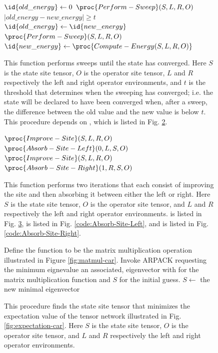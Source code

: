 \documentclass{article}
\begin{document}
\begin{figure}
\begin{codebox}
\li $\id{old\_energy} \gets 0$
\li $\proc{Perform-Sweep}(S,L,R,O)$
\li \While $|old\_energy-new\_energy| \ge t$
\li     \Do
\li         $\id{old\_energy} \gets \id{new\_energy}$
\li         $\proc{Perform-Sweep}(S,L,R,O)$
\li         $\id{new\_energy} \gets  \proc{Compute-Energy(S,L,R,O)}$
\end{codebox}
\caption{\label{code:Sweep-Until-Converged} This function performs sweeps until the state has converged. Here $S$ is the state site tensor, $O$ is the operator site tensor, $L$ and $R$ respectively the left and right operator environments, and $t$ is the threshold that determines when the sweeping has converged; i.e. the state will be declared to have been converged when, after a sweep, the difference between the old value and the new value is below $t$.  This procedure depends on , which is listed in Fig. \ref{code:Perform-Sweep}.}
\end{figure}

\begin{figure}
\begin{codebox}
\li $\proc{Improve-Site}(S,L,R,O)$
\li $\proc{Absorb-Site-Left}(0,L,S,O)$
\li $\proc{Improve-Site}(S,L,R,O)$
\li $\proc{Absorb-Site-Right}(1,R,S,O)$
\end{codebox}
\caption{\label{code:Perform-Sweep} This function performs two iterations that each consist of improving the site and then absorbing it between either the left or right.  Here $S$ is the state site tensor, $O$ is the operator site tensor, and $L$ and $R$ respectively the left and right operator environments.   is listed in Fig. \ref{code:Improve-Site},  is listed in Fig. \ref{code:Absorb-Site-Left}, and  is listed in Fig. \ref{code:Absorb-Site-Right}.}
\end{figure}

\begin{figure}
\begin{codebox}
\li Define the function  to be the matrix multiplication operation
\zi illustrated in Figure \ref{fig:matmul-car}.
\li Invoke ARPACK requesting the minimum eignevalue an associated,
\zi eigenvector with  for the matrix multiplication function and
\zi $S$ for the initial guess.
\li $S \gets$ the new minimal eigenvector
\end{codebox}
\caption{\label{code:Improve-Site} This procedure finds the state site tensor that minimizes the expectation value of the tensor network illustrated in Fig. \ref{fig:expectation-car}. Here $S$ is the state site tensor, $O$ is the operator site tensor, and $L$ and $R$ respectively the left and right operator environments.}
\end{figure}
\end{document}
